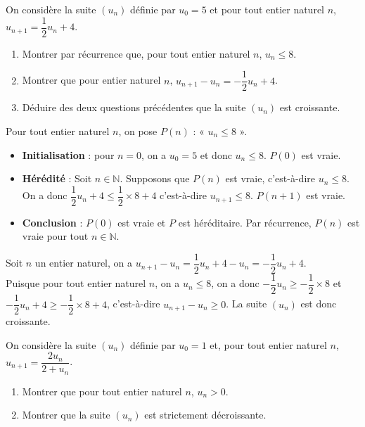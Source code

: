 \documentclass[11pt,fleqn]{book} %
\begin{document}
\begin{exercise}[topic=rec03]On considère la suite $(u_n)$ définie par $u_0=5$ et pour tout entier naturel $n$, $u_{n+1}=\dfrac{1}{2}u_n+4$.
\begin{enumerate}
\item Montrer par récurrence que, pour tout entier naturel $n$, $u_n \leqslant 8$.
\item Montrer que pour entier naturel $n$, $u_{n+1}-u_n = -\dfrac{1}{2}u_n+4$.
\item Déduire des deux questions précédentes que la suite $(u_n)$ est croissante.
\end{enumerate}\end{exercise}
\begin{solution}
Pour tout entier naturel $n$, on pose $P(n)$ : « $u_n \leqslant 8$ ».

\begin{itemize}
\item \textbf{Initialisation} : pour $n=0$, on a $u_0=5$ et donc $u_n \leqslant 8$. $P(0)$ est vraie.
\item \textbf{Hérédité} : Soit $n\in\mathbb{N}$. Supposons que $P(n)$ est vraie, c'est-à-dire $u_n \leqslant 8$. \\On a donc $\dfrac{1}{2}u_n+4 \leqslant \dfrac{1}{2}\times 8 +4$ c'est-à-dire $u_{n+1} \leqslant 8$. $P(n+1)$ est vraie.
\item \textbf{Conclusion} : $P(0)$ est vraie et $P$ est héréditaire. Par récurrence, $P(n)$ est vraie pour tout $n\in\mathbb{N}$.
\end{itemize}
Soit $n$ un entier naturel, on a $u_{n+1}-u_n = \dfrac{1}{2}u_n+4-u_n = -\dfrac{1}{2}u_n+4$.\\
Puisque pour tout entier naturel $n$, on a $u_n \leqslant 8$, on a donc $-\dfrac{1}{2}u_n \geqslant -\dfrac{1}{2} \times 8$ et $-\dfrac{1}{2}u_n+4 \geqslant -\dfrac{1}{2}\times 8 +4$, c'est-à-dire $u_{n+1}-u_n \geqslant 0$. La suite $(u_n)$ est donc croissante.\end{solution}

\begin{exercise}[topic=rec03]On considère la suite \((u_n)\) définie par \(u_0=1\) et, pour tout entier naturel \(n\), \(u_{n+1}=\dfrac{2u_n}{2+u_n}\).
\begin{enumerate}
\item Montrer que pour tout entier naturel \(n\), \(u_n > 0\).
\item Montrer que la suite \((u_n)\) est strictement décroissante.
\end{enumerate}\end{exercise}
\end{document}
